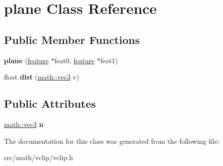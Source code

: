 \hypertarget{classplane}{
\section{plane Class Reference}
\label{classplane}
}
\subsection*{Public Member Functions}
\begin{DoxyCompactItemize}
\item 
\hypertarget{classplane_a86ba049725c9bd1993d4412c29a12771}{
{\bfseries plane} (\hyperlink{classfeature}{feature} $\ast$feat0, \hyperlink{classfeature}{feature} $\ast$feat1)}
\label{classplane_a86ba049725c9bd1993d4412c29a12771}

\item 
\hypertarget{classplane_ad55d61ae11dfdafe52127f725b844fda}{
float {\bfseries dist} (\hyperlink{classmath_1_1vec3}{math::vec3} v)}
\label{classplane_ad55d61ae11dfdafe52127f725b844fda}

\end{DoxyCompactItemize}
\subsection*{Public Attributes}
\begin{DoxyCompactItemize}
\item 
\hypertarget{classplane_a2abd702f2868e2b7ca6fd36378462b8d}{
\hyperlink{classmath_1_1vec3}{math::vec3} {\bfseries n}}
\label{classplane_a2abd702f2868e2b7ca6fd36378462b8d}

\end{DoxyCompactItemize}


The documentation for this class was generated from the following file:\begin{DoxyCompactItemize}
\item 
src/math/vclip/vclip.h\end{DoxyCompactItemize}
